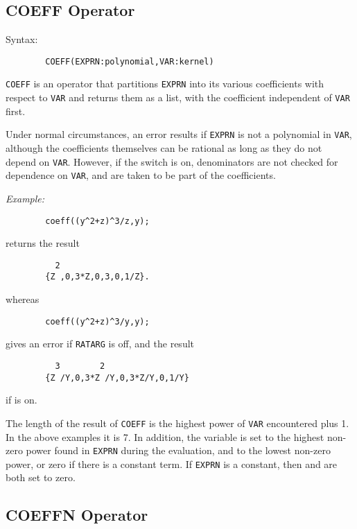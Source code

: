 \subsection{COEFF Operator}
\hypertarget{operator:COEFF}{}
\hypertarget{switch:RATARG}{}
Syntax:
\begin{verbatim}
        COEFF(EXPRN:polynomial,VAR:kernel)
\end{verbatim}
\texttt{COEFF} is an operator that partitions \texttt{EXPRN} into its various
coefficients with respect to \texttt{VAR} and returns them as a list, with
the coefficient independent of \texttt{VAR} first.

Under normal circumstances, an error results if \texttt{EXPRN} is not a
polynomial in \texttt{VAR}, although the coefficients themselves can be
rational as long as they do not depend on \texttt{VAR}.  However, if the
switch  is on, denominators are not checked for
dependence on \texttt{VAR}, and are taken to be part of the coefficients.

\textit{Example:}
\begin{verbatim}
        coeff((y^2+z)^3/z,y);
\end{verbatim}
returns the result
\begin{verbatim}
          2
        {Z ,0,3*Z,0,3,0,1/Z}.
\end{verbatim}
whereas
\begin{verbatim}
        coeff((y^2+z)^3/y,y);
\end{verbatim}
gives an error if \texttt{RATARG} is off, and the result
\begin{verbatim}
          3        2
        {Z /Y,0,3*Z /Y,0,3*Z/Y,0,1/Y}
\end{verbatim}
if  is on.

\hypertarget{reserved:HIGH_POW}{}
\hypertarget{reserved:LOW_POW}{}
The length of the result of \texttt{COEFF} is the highest power of \texttt{VAR}
encountered plus 1.  In the above examples it is 7.  In addition, the
variable  is set to the highest non-zero
power found in \texttt{EXPRN} during the evaluation, and 
 to the lowest non-zero power, or zero if there is a
constant term.  If \texttt{EXPRN} is a constant, then  and
 are both set to zero.

\subsection{COEFFN Operator}
\hypertarget{operator:COEFFN}{}

